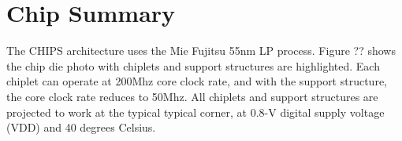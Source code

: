 \documentclass[../main.tex]{subfiles}
\begin{document}
\section{Chip Summary}

The CHIPS architecture uses the Mie Fujitsu 55nm LP process. Figure ?? shows the chip die photo with chiplets and support structures are highlighted. Each chiplet can operate at 200Mhz core clock rate, and with the support structure, the core clock rate reduces to 50Mhz. All chiplets and support structures are projected to work at the typical typical corner, at 0.8-V digital supply voltage (VDD) and 40 degrees Celsius. 

\end{document}
